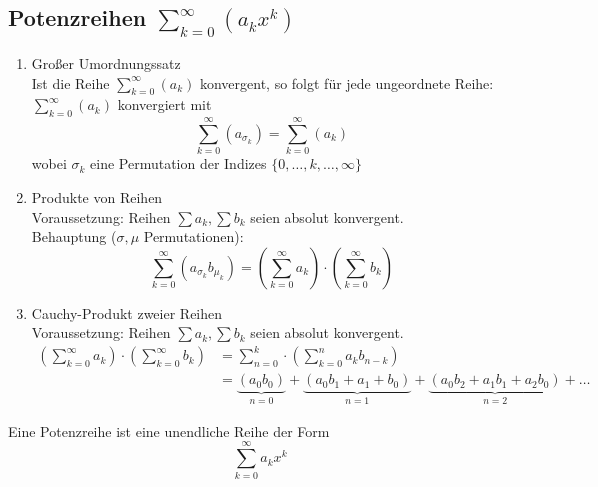
\subsection{Potenzreihen $ \sum_{k=0}^\infty \left( a_k x^k \right) $}
\label{sec:potenzreihen}

\begin{enumerate}

   \item Großer Umordnungssatz \\
   Ist die Reihe $ \sum_{k=0}^\infty \left( a_k \right) $ konvergent, so folgt für jede ungeordnete Reihe: $ \sum_{k=0}^\infty \left( a_k \right) $ konvergiert mit 
   \begin{equation*}
   \sum_{k=0}^\infty \left( a_{\sigma_k} \right) = \sum_{k=0}^\infty \left( a_k \right)
   \end{equation*}
   wobei $\sigma_k$ eine Permutation der Indizes $\{0,\ldots, k,\ldots, \infty\}$

   \item Produkte von Reihen \\
   Voraussetzung: Reihen $\sum a_k, \sum b_k$ seien absolut konvergent.\\
   Behauptung ($\sigma, \mu $ Permutationen):
   \begin{equation*}
      \sum_{k=0}^\infty \left( a_{\sigma_k} b_{\mu_k} \right) = \left(\sum_{k=0}^{\infty} a_k \right)\cdot \left(\sum_{k=0}^{\infty} b_k \right)
   \end{equation*}

   \item Cauchy-Produkt zweier Reihen \\
   Voraussetzung: Reihen $\sum a_k, \sum b_k $ seien absolut konvergent.\\
   \begin{align*}
      \left(\sum_{k=0}^\infty  a_k \right)\cdot\left(\sum_{k=0}^\infty  b_k\right) &= \sum_{n=0}^k \cdot \left(\sum_{k=0}^n  a_k b_{n-k} \right) \\
      &= \underbrace{(a_0 b_0)}_{n=0} + \underbrace{(a_0 b_1 + a_1 + b_0)}_{n=1} + \underbrace{(a_0 b_2 + a_1 b_1 + a_2 b_0)}_{n=2} + \ldots
   \end{align*}

\end{enumerate}

\begin{definition}[Potenzreihe]
   Eine Potenzreihe ist eine unendliche Reihe der Form
   \begin{equation*}
   \sum_{k=0}^\infty a_k x^k
   \end{equation*}
\end{definition} 

